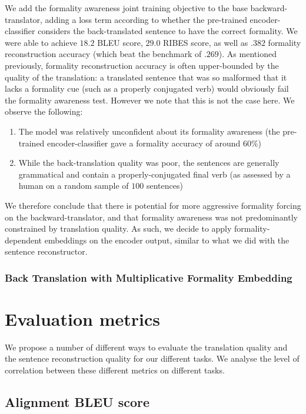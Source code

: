 \documentclass[11pt]{article}
\begin{document}
We add the formality awareness joint training objective to the base backward-translator, adding a loss term according to whether the pre-trained encoder-classifier considers the back-translated sentence to have the correct formality. We were able to achieve $18.2$ BLEU score, $29.0$ RIBES score, as well as $.382$ formality reconstruction accuracy (which beat the benchmark of $.269$). As mentioned previously, formality reconstruction accuracy is often upper-bounded by the quality of the translation: a translated sentence that was so malformed that it lacks a formality cue (such as a properly conjugated verb) would obviously fail the formality awareness test. However we note that this is not the case here. We observe the following:

\begin{enumerate}[label=\arabic*]
    \item The model was relatively unconfident about its formality awareness (the pre-trained encoder-classifier gave a formality accuracy of around $60\%$)
    \item While the back-translation quality was poor, the sentences are generally grammatical and contain a properly-conjugated final verb (as assessed by a human on a random sample of $100$ sentences)
\end{enumerate}

We therefore conclude that there is potential for more aggressive formality forcing on the backward-translator, and that formality awareness was not predominantly constrained by translation quality. As such, we decide to apply formality-dependent embeddings on the encoder output, similar to what we did with the sentence reconstructor.

\subsubsection{Back Translation with Multiplicative Formality Embedding}

\section{Evaluation metrics}

We propose a number of different ways to evaluate the translation quality and the sentence reconstruction quality for our different tasks. We analyse the level of correlation between these different metrics on different tasks.

\subsection{Alignment BLEU score}
\end{document}
